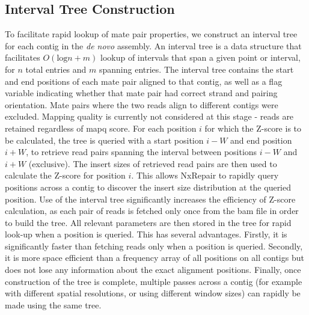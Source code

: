 \documentclass[fleqn,10pt]{wlpeerj}
\begin{document}
\subsection*{Interval Tree Construction}
To facilitate rapid lookup of mate pair properties, we construct an interval tree~\citep{cormen2009} for each contig in the \textit{de novo} assembly. An interval tree is a data structure that facilitates $O(\text{log} n + m)$ lookup of intervals that span a given point or interval, for $n$ total entries and $m$ spanning entries. The interval tree contains the start and end positions of each mate pair aligned to that contig, as well as a flag variable indicating whether that mate pair had correct strand and pairing orientation. Mate pairs where the two reads align to different contigs were excluded. Mapping quality is currently not considered at this stage - reads are retained regardless of mapq score. For each position $i$ for which the Z-score is to be calculated, the tree is queried with a start position $i-W$ and end position $i+W$, to retrieve read pairs spanning the interval between positions $i-W$ and $i+W$ (exclusive). The insert sizes of retrieved read pairs are then used to calculate the Z-score for position $i$. This allows NxRepair to rapidly query positions across a contig to discover the insert size distribution at the queried position. Use of the interval tree significantly increases the efficiency of Z-score calculation, as each pair of reads is fetched only once from the bam file in order to build the tree. All relevant parameters are then stored in the tree for rapid look-up when a position is queried. This has several advantages. Firstly, it is significantly faster than fetching reads only when a position is queried. Secondly, it is more space efficient than a frequency array of all positions on all contigs but does not lose any information about the exact alignment positions. Finally, once construction of the tree is complete, multiple passes across a contig (for example with different spatial resolutions, or using different window sizes) can rapidly be made using the same tree.      
\end{document}
